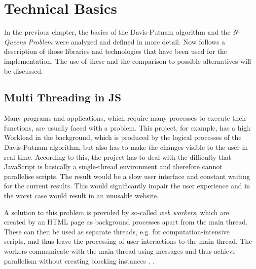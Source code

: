 

\chapter{Technical Basics}
\label{ch:tecBasics}
In the previous chapter, the basics of the Davis-Putnam algorithm and the \textit{N-Queens Problem} were analyzed and defined in more detail. Now follows a description of those libraries and technologies that have been used for the implementation. The use of these and the comparison to possible alternatives will be discussed. 

\section{Multi Threading in JS}
\label{sec:tecWorker}
Many programs and applications, which require many processes to execute their functions, are usually faced with a problem. This project, for example, has a high Workload in the background, which is produced by the logical processes of the Davis-Putnam algorithm, but also has to make the changes visible to the user in real time. According to this, the project has to deal with the difficulty that JavaScript is basically a single-thread environment and therefore cannot parallelise scripts. The result would be a slow user interface and constant waiting for the current results. This would significantly impair the user experience and in the worst case would result in an unusable website.

A solution to this problem is provided by so-called \emph{web workers}, which are created by an HTML page as background processes apart from the main thread. These can then be used as separate threads, e.g. for computation-intensive scripts, and thus leave the processing of user interactions to the main thread. The workers communicate with the main thread using messages and thus achieve parallelism without creating blocking instances \cite{Peng2017}, \cite{Bidelman2010}. 

